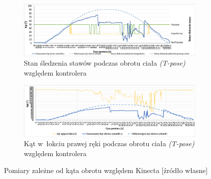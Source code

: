 \begin{figure}  [!htp] 
	\centering
	\begin{subfigure}[b]{0.8\textwidth}
		\centering
		\includegraphics[width=\linewidth]{images/kinectRotation.png}
		\caption{Stan śledzenia stawów podczas obrotu ciała \emph{(T-pose)} względem kontrolera}
		\label{fig:characteristics:kinect:bodyRotationChart}
	\end{subfigure}	
			
	\begin{subfigure}[b]{0.8\textwidth}
		\centering
		\includegraphics[width=\linewidth]{images/kinectRightHandElbowAngle.png}
		\caption{Kąt w~łokciu prawej ręki podczas obrotu ciała \emph{(T-pose)} względem kontrolera}
		\label{fig:characteristics:kinect:kinectRightHandElbowAngle}
	\end{subfigure}												
	\caption{Pomiary zależne od kąta obrotu względem Kinecta [źródło własne]}
\end{figure}
		
